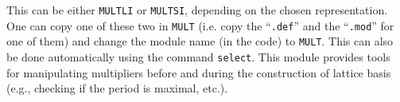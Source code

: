 
This can be either {\tt MULTLI} or {\tt MULTSI}, depending on the chosen
representation.
One can copy one of these two in {\tt MULT} (i.e. copy the
``{\tt .def}'' and the ``{\tt .mod}'' for one of them)
and change the module name (in the code) to {\tt MULT}.
This can also be done automatically using the command {\tt select}.
This module provides tools for manipulating multipliers
before and during the construction of lattice basis
(e.g., checking if the period is maximal, etc.).
